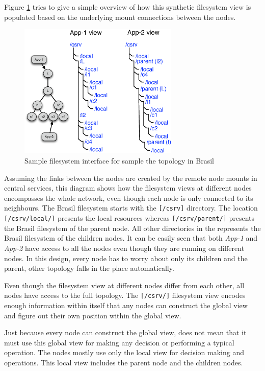 Figure \ref{fig:xcpu3FSTopo} tries to give a simple overview of how this 
synthetic filesystem view is populated based on the underlying mount
connections between the nodes.

\begin{figure}[htp]
\centering
\includegraphics[width=3in]{./img/csrv-views.eps}
\caption{Sample filesystem interface for sample the topology in Brasil}
\label{fig:xcpu3FSTopo}
\end{figure}

Assuming the links between the nodes are created by the remote node mounts in
central services, this diagram shows how the filesystem views at different
nodes encompasses the whole network, even though each node is only connected to
its neighbours. The Brasil filesystem starts with the \texttt{[/csrv]}
directory. The location \texttt{[/csrv/local/]} presents the local resources
whereas \texttt{[/csrv/parent/]} presents the Brasil filesystem of the parent
node. All other directories in the represents the Brasil filesystem of the
children nodes.  It can be easily seen that both \textit{App-1} and
\textit{App-2} have access to all the nodes even though they are running on
different nodes.  In this design, every node has to worry about only its
children and the parent, other topology falls in the place automatically.

Even though the filesystem view at different nodes differ from each other, 
all nodes have access to the full topology.  The \texttt{[/csrv/]} filesystem
view encodes enough information within itself that any nodes can construct the
global view and figure out their own position within the global view.

Just because every node can construct the global view, does not mean that it
must use this global view for making any decision or performing a typical
operation. The nodes mostly use only the local view for decision making and
operations. This local view includes the parent node and the children nodes.



